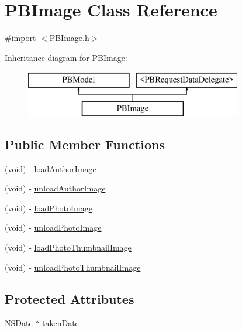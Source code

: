 \hypertarget{interface_p_b_image}{
\section{PBImage Class Reference}
\label{interface_p_b_image}
}


{\ttfamily \#import $<$PBImage.h$>$}

Inheritance diagram for PBImage:\begin{figure}[H]
\begin{center}
\leavevmode
\includegraphics[height=2cm]{interface_p_b_image}
\end{center}
\end{figure}
\subsection*{Public Member Functions}
\begin{DoxyCompactItemize}
\item 
(void) -\/ \hyperlink{interface_p_b_image_a4af15f2a0b22a1cb6fb88aafbc7fa2d5}{loadAuthorImage}
\item 
(void) -\/ \hyperlink{interface_p_b_image_a309bbbd97bdb73cd5ce68b85dd10d2ef}{unloadAuthorImage}
\item 
(void) -\/ \hyperlink{interface_p_b_image_a97e942803d2815e8cf393da6c6d8c78e}{loadPhotoImage}
\item 
(void) -\/ \hyperlink{interface_p_b_image_a59d1856264f9708693f57071a56a03f5}{unloadPhotoImage}
\item 
(void) -\/ \hyperlink{interface_p_b_image_a002ec7944ae9c0e779867a42af048945}{loadPhotoThumbnailImage}
\item 
(void) -\/ \hyperlink{interface_p_b_image_a4b836242ce7c4ce1cd008a487481d6bf}{unloadPhotoThumbnailImage}
\end{DoxyCompactItemize}
\subsection*{Protected Attributes}
\begin{DoxyCompactItemize}
\item 
NSDate $\ast$ \hyperlink{interface_p_b_image_a9870fa11fd951bc55b7a115c227f0f97}{takenDate}
\end{DoxyCompactItemize}

